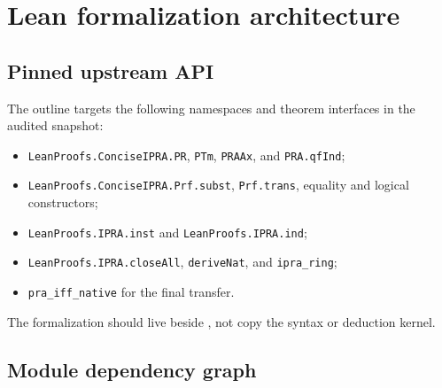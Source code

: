 \section{Lean formalization architecture}\label{sec:lean}

\subsection{Pinned upstream API}

The outline targets the following namespaces and theorem interfaces in the audited snapshot:
\begin{itemize}
  \item \texttt{LeanProofs.ConciseIPRA.PR}, \texttt{PTm}, \texttt{PRAAx}, and \texttt{PRA.qfInd};
  \item \texttt{LeanProofs.ConciseIPRA.Prf.subst}, \texttt{Prf.trans}, equality and logical constructors;
  \item \texttt{LeanProofs.IPRA.inst} and \texttt{LeanProofs.IPRA.ind};
  \item \texttt{LeanProofs.IPRA.closeAll}, \texttt{deriveNat}, and \texttt{ipra\_ring};
  \item \texttt{pra\_iff\_native} for the final transfer.
\end{itemize}
The formalization should live beside , not copy the syntax or deduction kernel.

\subsection{Module dependency graph}

